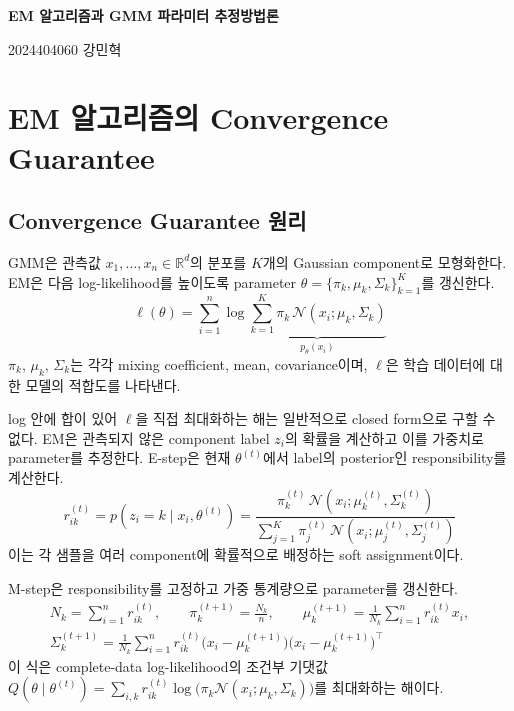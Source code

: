 \documentclass[a4paper,11pt]{article}
\newcommand{\R}{\mathbb{R}}
\newcommand{\Normal}{\mathcal{N}}
\numberwithin{equation}{section}
\begin{document}
\begin{center}
  {\LARGE\bfseries EM 알고리즘과 GMM 파라미터 추정방법론}\par
  \vspace{0.35em} 2024404060 강민혁
\end{center}
\section{EM 알고리즘의 Convergence Guarantee}
\subsection{Convergence Guarantee 원리}
GMM은 관측값 $x_1,\ldots,x_n\in\R^d$의 분포를 $K$개의 Gaussian component로 모형화한다.
EM은 다음 log-likelihood를 높이도록 parameter $\theta=\{\pi_k,\mu_k,\Sigma_k\}_{k=1}^{K}$를 갱신한다.
\begin{equation}
 \ell(\theta)=\sum_{i=1}^{n}\log
 \underbrace{\sum_{k=1}^{K}\pi_k\,\Normal(x_i;\mu_k,\Sigma_k)}_{p_\theta(x_i)}
 \label{eq:loglik}
\end{equation}
$\pi_k$, $\mu_k$, $\Sigma_k$는 각각 mixing coefficient, mean, covariance이며,
$\ell$은 학습 데이터에 대한 모델의 적합도를 나타낸다.

log 안에 합이 있어 $\ell$을 직접 최대화하는 해는 일반적으로 closed form으로 구할 수 없다.
EM은 관측되지 않은 component label $z_i$의 확률을 계산하고 이를 가중치로 parameter를 추정한다.
E-step은 현재 $\theta^{(t)}$에서 label의 posterior인 responsibility를 계산한다.
\begin{equation}
 r_{ik}^{(t)}=p(z_i=k\mid x_i,\theta^{(t)})
 =\frac{\pi_k^{(t)}\,\Normal(x_i;\mu_k^{(t)},\Sigma_k^{(t)})}
 {\sum_{j=1}^{K}\pi_j^{(t)}\,\Normal(x_i;\mu_j^{(t)},\Sigma_j^{(t)})}
 \label{eq:estep}
\end{equation}
이는 각 샘플을 여러 component에 확률적으로 배정하는 soft assignment이다.

M-step은 responsibility를 고정하고 가중 통계량으로 parameter를 갱신한다.
\begin{equation}
\begin{gathered}
 N_k=\sum_{i=1}^{n}r_{ik}^{(t)},\qquad
 \pi_k^{(t+1)}=\frac{N_k}{n},\qquad
 \mu_k^{(t+1)}=\frac{1}{N_k}\sum_{i=1}^{n}r_{ik}^{(t)}x_i,\\
 \Sigma_k^{(t+1)}=\frac{1}{N_k}\sum_{i=1}^{n}r_{ik}^{(t)}
 \bigl(x_i-\mu_k^{(t+1)}\bigr)\bigl(x_i-\mu_k^{(t+1)}\bigr)^{\top}
\end{gathered}
\label{eq:mstep}
\end{equation}
이 식은 complete-data log-likelihood의 조건부 기댓값
$Q(\theta\mid\theta^{(t)})=\sum_{i,k}r_{ik}^{(t)}\log\bigl(\pi_k\Normal(x_i;\mu_k,\Sigma_k)\bigr)$를
최대화하는 해이다.
\end{document}
